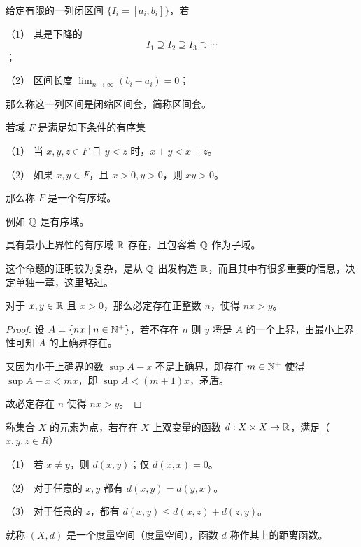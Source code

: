 \begin{definition}[闭区间套]
	给定有限的一列闭区间 $\{ I_i = [a_i, b_i] \}$，若

	（1） 其是下降的
	\[ I_1 \supseteq I_2  \supseteq I_3  \supset \cdots \]；

	（2） 区间长度 $\lim_{n \to \infty} (b_i - a_i) = 0$；

	那么称这一列区间是闭缩区间套，简称区间套。
\end{definition}

\begin{definition}[有序域]
	若域 $F$ 是满足如下条件的有序集

	（1） 当 $x,y,z\in F$ 且 $y<z$ 时，$x+y<x+z$。

	（2） 如果 $x,y\in F$，且 $x>0,y>0$，则 $xy>0$。

	那么称 $F$ 是一个有序域。
\end{definition}

例如 $\mathbb{Q}$ 是有序域。

\begin{theorem}[存在定理]
	具有最小上界性的有序域 $\mathbb{R}$ 存在，且包容着 $\mathbb{Q}$ 作为子域。
\end{theorem}

这个命题的证明较为复杂，是从 $\mathbb{Q}$ 出发构造 $\mathbb{R}$，而且其中有很多重要的信息，决定单独一章，这里略过。

\begin{theorem}[Achimedes 原理]
	对于 $x,y \in \mathbb{R}$ 且 $x>0$，那么必定存在正整数 $n$，使得 $nx>y$。
\end{theorem}
\begin{proof}
	设 $A = \{nx \mid n \in \mathbb{N}^+ \}$，若不存在 $n$ 则 $y$ 将是 $A$ 的一个上界，由最小上界性可知 $A$ 的上确界存在。

	又因为小于上确界的数 $\sup A-x$ 不是上确界，即存在 $m\in \mathbb{N}^+$ 使得 $\sup A -x <mx$，即 $\sup A < (m+1)x$，矛盾。

	故必定存在 $n$ 使得 $nx>y$。
\end{proof}

\begin{definition}[度量空间]
	称集合 $X$ 的元素为点，若存在 $X$ 上双变量的函数 $d:X \times X \to \mathbb{R}$，满足（$x,y,z\in R$）

	（1） 若 $x\ne y$，则 $d(x,y)$；仅 $d(x,x)=0$。

	（2） 对于任意的 $x,y$ 都有 $d(x,y) = d(y,x)$。

	（3） 对于任意的 $z$，都有 $d(x,y) \leqslant d(x,z) + d(z,y)$。

	就称 $(X,d)$ 是一个度量空间（度量空间），函数 $d$ 称作其上的距离函数。
\end{definition}

